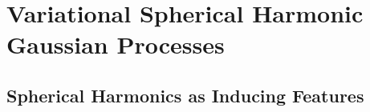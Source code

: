 
\section{Variational Spherical Harmonic Gaussian Processes}

\subsection{Spherical Harmonics as Inducing Features}
\label{sec:vish}

